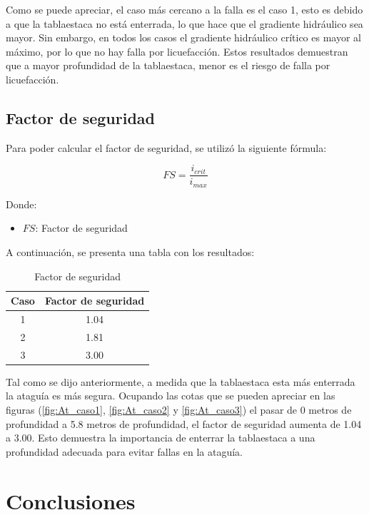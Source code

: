 \documentclass{article}
\begin{document}
Como se puede apreciar, el caso más cercano a la falla es el caso 1, esto es debido a que la tablaestaca no está enterrada, lo que hace que el gradiente hidráulico sea mayor. Sin embargo, en todos los casos el gradiente hidráulico crítico es mayor al máximo, por lo que no hay falla por licuefacción. Estos resultados demuestran que a mayor profundidad de la tablaestaca, menor es el riesgo de falla por licuefacción.

\newpage
\subsection{Factor de seguridad}
Para poder calcular el factor de seguridad, se utilizó la siguiente fórmula:

\begin{equation}
  FS = \frac{i_{crit}}{i_{max}}
\end{equation}

Donde:
\begin{itemize}
    \item $FS$: Factor de seguridad
\end{itemize}

A continuación, se presenta una tabla con los resultados:

\begin{table}[h!]
  \centering
  \begin{tabular}{cc}
    \hline
    \textbf{Caso} & \textbf{Factor de seguridad} \\
    \hline
    1 &1.04 \\
    2 &1.81 \\
    3 &3.00 \\
    \hline
  \end{tabular}
  \caption{Factor de seguridad}
  \label{tab:seguridad}
\end{table}

Tal como se dijo anteriormente, a medida que la tablaestaca esta más enterrada la ataguía es más segura. Ocupando las cotas que se pueden apreciar en las figuras (\ref{fig:At_caso1}, \ref{fig:At_caso2} y \ref{fig:At_caso3}) el pasar de 0 metros de profundidad a 5.8 metros de profundidad, el factor de seguridad aumenta de 1.04 a 3.00. Esto demuestra la importancia de enterrar la tablaestaca a una profundidad adecuada para evitar fallas en la ataguía. 

\newpage

\section{Conclusiones}
\end{document}

